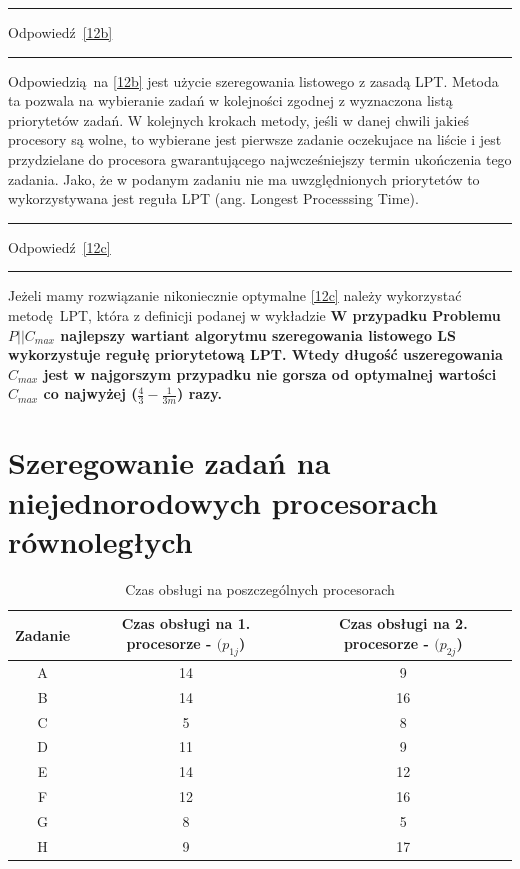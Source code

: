 \documentclass{article}
\begin{document}
\par\noindent\rule{\textwidth}{0.4pt}
Odpowiedź \ref{12b}
\par\noindent\rule{\textwidth}{0.4pt}

Odpowiedzią na \ref{12b} jest użycie szeregowania listowego z zasadą LPT. Metoda ta pozwala na wybieranie zadań w kolejności zgodnej z wyznaczona listą priorytetów zadań. W kolejnych krokach metody, jeśli w danej chwili jakieś procesory są wolne, to wybierane jest pierwsze zadanie oczekujace na liście i jest przydzielane do procesora gwarantującego najwcześniejszy termin ukończenia tego zadania. Jako, że w podanym zadaniu nie ma uwzględnionych priorytetów to wykorzystywana jest reguła LPT (ang. Longest Processsing Time).

\par\noindent\rule{\textwidth}{0.4pt}
Odpowiedź \ref{12c}
\par\noindent\rule{\textwidth}{0.4pt}

Jeżeli mamy rozwiązanie nikoniecznie optymalne \ref{12c} należy wykorzystać metodę LPT, która z definicji podanej w wykładzie \textbf{W przypadku Problemu $P||C_{max}$ najlepszy wartiant algorytmu szeregowania listowego LS wykorzystuje regułę priorytetową LPT. Wtedy długość uszeregowania $C_{max}$ jest w najgorszym przypadku nie gorsza od optymalnej wartości $C_{max}$ co najwyżej ($\frac{4}{3} - \frac{1}{3m}$) razy.}

\section{Szeregowanie zadań na niejednorodowych procesorach równoległych}

\begin{table}[H]
	\centering
	\begin{tabular}{| c | c | c |}
		\hline
		Zadanie & Czas obsługi na 1. procesorze - $(p_{1j}$) & Czas obsługi na 2. procesorze - $(p_{2j}$) \\
		\hline
		A       & 14                                         & 9                                          \\
		B       & 14                                         & 16                                         \\
		C       & 5                                          & 8                                          \\
		D       & 11                                         & 9                                          \\
		E       & 14                                         & 12                                         \\
		F       & 12                                         & 16                                         \\
		G       & 8                                          & 5                                          \\
		H       & 9                                          & 17                                         \\
		\hline
	\end{tabular}
	\caption{Czas obsługi na poszczególnych procesorach}
	\
\end{table}
\end{document}

